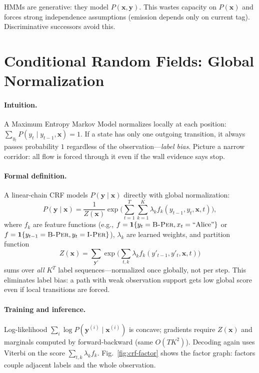 HMMs are generative: they model $P(\mathbf{x},\mathbf{y})$. This wastes capacity on $P(\mathbf{x})$ and forces strong independence assumptions (emission depends only on current tag). Discriminative successors avoid this.

\section{Conditional Random Fields: Global Normalization}
\label{sec:crf}
\paragraph{Intuition.} A Maximum Entropy Markov Model normalizes locally at each position: $\sum_{y_t} P(y_t\mid y_{t-1}, \mathbf{x})=1$. If a state has only one outgoing transition, it always passes probability $1$ regardless of the observation---\emph{label bias}. Picture a narrow corridor: all flow is forced through it even if the wall evidence says stop.

\paragraph{Formal definition.} A linear-chain CRF models $P(\mathbf{y}\mid\mathbf{x})$ directly with global normalization:
\begin{equation}
P(\mathbf{y}\mid\mathbf{x}) = \frac{1}{Z(\mathbf{x})}\exp\!\Big(\sum_{t=1}^{T}\sum_{k=1}^{K}\lambda_k f_k(y_{t-1}, y_t, \mathbf{x}, t)\Big),
\label{eq:crf}
\end{equation}
where $f_k$ are feature functions (e.g., $f=\mathbf{1}\{y_t=\textsc{B-Per}, x_t=\text{``Alice''}\}$ or $f=\mathbf{1}\{y_{t-1}=\textsc{B-Per}, y_t=\textsc{I-Per}\}$), $\lambda_k$ are learned weights, and partition function
\begin{equation}
Z(\mathbf{x})=\sum_{\mathbf{y}'}\exp\big(\sum_{t,k}\lambda_k f_k(y'_{t-1},y'_t,\mathbf{x},t)\big)
\label{eq:partition}
\end{equation}
sums over \emph{all} $K^T$ label sequences---normalized once globally, not per step. This eliminates label bias: a path with weak observation support gets low global score even if local transitions are forced.

\paragraph{Training and inference.} Log-likelihood $\sum_i \log P(\mathbf{y}^{(i)}\mid\mathbf{x}^{(i)})$ is concave; gradients require $Z(\mathbf{x})$ and marginals computed by forward-backward (same $O(TK^2)$). Decoding again uses Viterbi on the score $\sum_{t,k}\lambda_k f_k$. Fig.~\ref{fig:crf-factor} shows the factor graph: factors couple adjacent labels and the whole observation.

